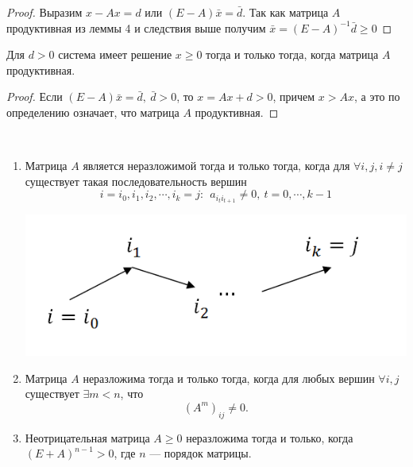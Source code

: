 \begin{proof}
    Выразим $x-Ax=d$ или $(E-A)\bar x=\bar d$. Так как матрица $A$ продуктивная из леммы 4 и следствия выше получим $\bar x=(E-A)^{-1}\bar d\geqslant 0$
\end{proof}
\begin{consequence}
    Для $d>0$ система имеет решение $x \geqslant 0$ тогда и только тогда, когда матрица $A$ продуктивная.
\end{consequence}
\begin{proof}
    Если $(E-A)\bar x=\bar d,~\bar d>0$, то $x=Ax+d>0$, причем $x>Ax$, а это по определению означает, что матрица $A$ продуктивная.
\end{proof}
\begin{statement}
    \ 
\begin{enumerate}
    \item Матрица $A$ является неразложимой тогда и только тогда, когда для $\forall i, j, i\neq j$ существует такая последовательность вершин $$i=i_0, i_1, i_2, \cdots, i_k=j:~~a_{i_t i_{t+1}}\neq 0,~t=0, \cdots, k-1$$
    \begin{center}
        \includegraphics[scale=0.6]{l14_2.png}\\
    \end{center}
    \item Матрица $A$ неразложима тогда и только тогда, когда для любых вершин $\forall i, j$ существует $\exists m<n$, что $$(A^m)_{ij}\neq 0.$$
    \item Неотрицательная матрица $A\geqslant 0$ неразложима тогда и только, когда $(E+A)^{n-1}>0$, где $n$ --- порядок матрицы.
\end{enumerate}
\end{statement}
